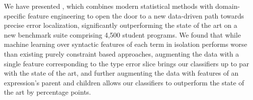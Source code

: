 \label{sec:conclusion}

We have presented \toolname, which
combines modern statistical methods
with domain-specific feature engineering
to open the door to a new data-driven
path towards precise error localization,
significantly outperforming the
state of the art on a new benchmark
suite comprising 4,500 student programs.
%
%
We found that while machine learning
over syntactic features of each term in isolation
performs worse than existing
purely constraint based approaches, %
augmenting the data with a single feature corresponding to
the type error slice brings our
classifiers up to par with the state of the art,
and further augmenting the data with
features of an expression's parent and children
allows our classifiers to outperform
the state of the art by \ToolnameWinSherrloc
percentage points.



